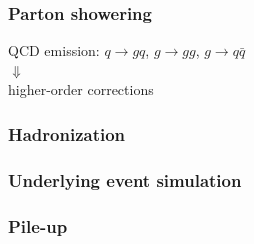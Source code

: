 \begin{frame}\frametitle{Parton showering}
\centering\myskip

\vspace{.4\paperheight}


QCD emission: $q\to gq$, $g\to gg$, $g\to q\bar{q}$\\
{\LARGE $\Downarrow$}\\
higher-order corrections 


\end{frame}

\begin{frame}\frametitle{Hadronization}
\centering\myskip


\vspace{.4\paperheight}


\end{frame}


\begin{frame}\frametitle{Underlying event simulation}
\centering\myskip


\vspace{.4\paperheight}


\end{frame}


\begin{frame}\frametitle{Pile-up}
\centering\myskip

\end{frame}
